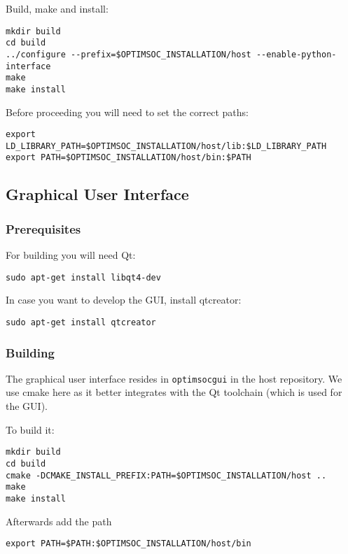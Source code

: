 Build, make and install:

\begin{lstlisting}
mkdir build
cd build
../configure --prefix=$OPTIMSOC_INSTALLATION/host --enable-python-interface
make
make install
\end{lstlisting}

Before proceeding you will need to set the correct paths:

\begin{lstlisting}
export LD_LIBRARY_PATH=$OPTIMSOC_INSTALLATION/host/lib:$LD_LIBRARY_PATH
export PATH=$OPTIMSOC_INSTALLATION/host/bin:$PATH
\end{lstlisting}

\subsection{Graphical User Interface}

\subsubsection{Prerequisites}

For building you will need Qt:

\begin{lstlisting}
sudo apt-get install libqt4-dev
\end{lstlisting}

In case you want to develop the GUI, install qtcreator:

\begin{lstlisting}
sudo apt-get install qtcreator
\end{lstlisting}

\subsubsection{Building}

The graphical user interface resides in \verb|optimsocgui| in the host
repository. We use cmake here as it better integrates with the Qt
toolchain (which is used for the GUI).

To build it:

\begin{lstlisting}
mkdir build
cd build
cmake -DCMAKE_INSTALL_PREFIX:PATH=$OPTIMSOC_INSTALLATION/host ..
make
make install
\end{lstlisting}

Afterwards add the path

\begin{lstlisting}
export PATH=$PATH:$OPTIMSOC_INSTALLATION/host/bin
\end{lstlisting}

